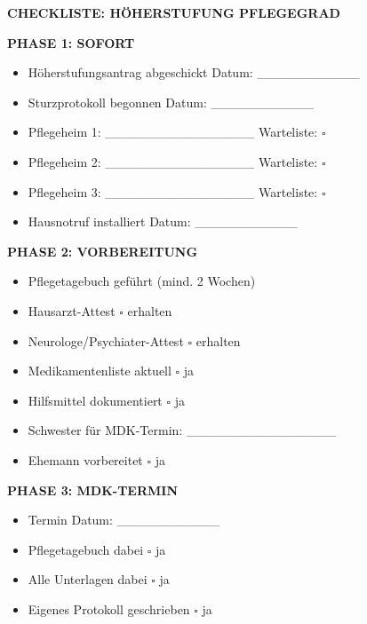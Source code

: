 \documentclass[11pt,a4paper]{article}
\begin{document}
\begin{graybox}
\begin{center}
\textbf{\Large CHECKLISTE: HÖHERSTUFUNG PFLEGEGRAD}
\end{center}

\vspace{0.5cm}
\textbf{PHASE 1: SOFORT}
\begin{itemize}[noitemsep]
    \item[$\square$] Höherstufungsantrag abgeschickt \hfill Datum: \_\_\_\_\_\_\_\_\_\_\_
    \item[$\square$] Sturzprotokoll begonnen \hfill Datum: \_\_\_\_\_\_\_\_\_\_\_
    \item[$\square$] Pflegeheim 1: \_\_\_\_\_\_\_\_\_\_\_\_\_\_\_\_ \hfill Warteliste: $\square$
    \item[$\square$] Pflegeheim 2: \_\_\_\_\_\_\_\_\_\_\_\_\_\_\_\_ \hfill Warteliste: $\square$
    \item[$\square$] Pflegeheim 3: \_\_\_\_\_\_\_\_\_\_\_\_\_\_\_\_ \hfill Warteliste: $\square$
    \item[$\square$] Hausnotruf installiert \hfill Datum: \_\_\_\_\_\_\_\_\_\_\_
\end{itemize}

\vspace{0.5cm}
\textbf{PHASE 2: VORBEREITUNG}
\begin{itemize}[noitemsep]
    \item[$\square$] Pflegetagebuch geführt (mind. 2 Wochen)
    \item[$\square$] Hausarzt-Attest \hfill $\square$ erhalten
    \item[$\square$] Neurologe/Psychiater-Attest \hfill $\square$ erhalten
    \item[$\square$] Medikamentenliste aktuell \hfill $\square$ ja
    \item[$\square$] Hilfsmittel dokumentiert \hfill $\square$ ja
    \item[$\square$] Schwester für MDK-Termin: \_\_\_\_\_\_\_\_\_\_\_\_\_\_\_\_
    \item[$\square$] Ehemann vorbereitet \hfill $\square$ ja
\end{itemize}

\vspace{0.5cm}
\textbf{PHASE 3: MDK-TERMIN}
\begin{itemize}[noitemsep]
    \item[$\square$] Termin \hfill Datum: \_\_\_\_\_\_\_\_\_\_\_
    \item[$\square$] Pflegetagebuch dabei \hfill $\square$ ja
    \item[$\square$] Alle Unterlagen dabei \hfill $\square$ ja
    \item[$\square$] Eigenes Protokoll geschrieben \hfill $\square$ ja
\end{itemize}


\end{graybox}
\end{document}
